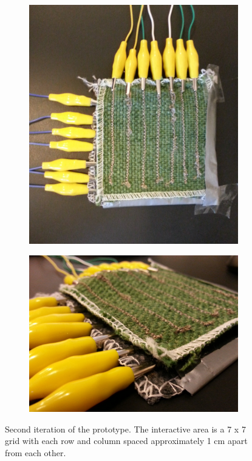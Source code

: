 \begin{figure}[h]
\centering
\begin{subfigure}[t]{.5\textwidth}
  \centering
  \includegraphics[width=.9\linewidth]{figures/touch/proto2_1}
\end{subfigure}%
\begin{subfigure}[t]{.5\textwidth}
  \centering
  \includegraphics[width=.9\linewidth]{figures/touch/proto2_2}
\end{subfigure}
\caption{Second iteration of the prototype. The interactive area is a 7 x 7 grid with each row and column spaced approximately 1 cm apart from each other.}
\label{prototype_2}
\end{figure}


